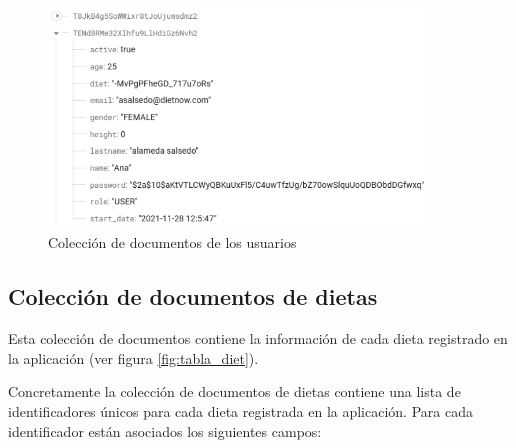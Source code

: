 \begin{figure}[H]
    \centering
    \includegraphics[width=0.9\textwidth]{Images/Capitulo5/Tabla_users.png}
    \caption{Colección de documentos de los usuarios}
    \label{fig:tabla_user}
\end{figure}
\newpage



\subsection{Colección de documentos de dietas}
Esta colección de documentos contiene la información de cada dieta registrado en la aplicación (ver figura \ref{fig:tabla_diet}).

Concretamente la colección de documentos de dietas contiene una lista de identificadores únicos para cada dieta registrada en la aplicación. Para cada identificador están asociados los siguientes campos:

